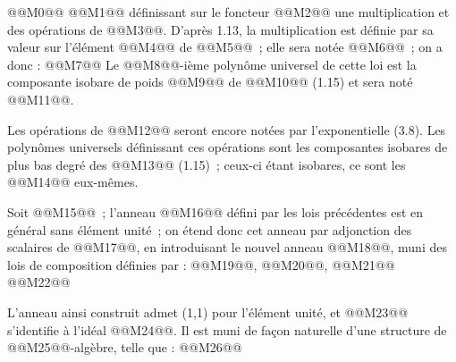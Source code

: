 
@@M0@@
@@M1@@
définissant sur le foncteur @@M2@@ une multiplication et des opérations de @@M3@@. D'après 1.13, la multiplication est définie par sa valeur sur l'élément @@M4@@ de @@M5@@~; elle sera notée @@M6@@~; on a donc :
@@M7@@
Le @@M8@@-ième polynôme universel de cette loi est la composante isobare de poids @@M9@@ de @@M10@@ (1.15) et sera noté @@M11@@.

Les opérations de @@M12@@ seront encore notées par l'exponentielle (3.8). Les polynômes universels définissant ces opérations sont les composantes isobares de plus bas degré des @@M13@@ (1.15)~; ceux-ci étant isobares, ce sont les @@M14@@ eux-mêmes.

Soit @@M15@@~; l'anneau @@M16@@ défini par les lois précédentes est en général sans élément unité~; on étend donc cet anneau par adjonction des scalaires de @@M17@@, en introduisant le nouvel anneau @@M18@@, muni des lois de composition définies par : @@M19@@, @@M20@@,
@@M21@@
@@M22@@

L'anneau ainsi construit admet (1,1) pour l'élément unité, et @@M23@@ s'identifie à l'idéal @@M24@@. Il est muni de façon naturelle d'une structure de @@M25@@-algèbre, telle que :
@@M26@@

